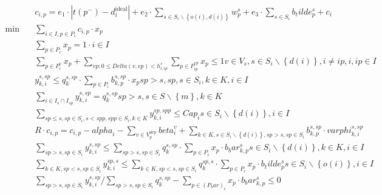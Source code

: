 \begin{align}
  & c_{i , p} = e_{1} \cdot \left|t \left(p^{-}\right) - d_{i}^{\text{ideal}}\right| + e_{2} \cdot \sum_{s \in S_{i} \backslash \left\{o \left(i\right) , d \left(i\right)\right\}} w_{p}^{s} + e_{3} \cdot \sum_{s \in S_{i}} b_tilde_{p}^{s} + c_{i} \tag{eq\_0001} \\
  \min\quad & \sum_{i \in I, p \in P_{i}} c_{i , p} \cdot x_{p} \tag{eq\_0002} \\
  & \sum_{p \in P_{i}} x_{p} = 1 \cdot i \in I \tag{eq\_0003} \\
  & \sum_{p \in P_{i}^{v}} x_{p} + \underset{vp : 0 \leq \mathit{Delta} \left(v , vp\right) < h_{i , ip}^{s}}{\sum} \underset{p \in P_{ip}^{vp}}{\sum} x_{p} \leq 1 v \in V_{s} , s \in S_{i} \backslash \left\{d \left(i\right)\right\} , i \neq ip , i , ip \in I \tag{eq\_0004} \\
  & y_{k , i}^{s , sp} \leq q_{k}^{s , sp} \cdot \sum_{p \in P_{i}} b_{k , p}^{s , sp} \cdot x_{p} sp > s , sp , s \in S_{i} , k \in K , i \in I \tag{eq\_0005} \\
  & \underset{i \in I_{s} \cap I_{sp}}{\sum} y_{k , i}^{s , sp} = q_{k}^{s , sp} sp > s , s \in S \backslash \left\{m\right\} , k \in K \tag{eq\_0006} \\
  & \sum_{sp \leq s , sp \in S_{i}, s < spp , spp \in S_{i}, k \in K} y_{k , i}^{sp , spp} \leq \mathit{Cap}_{i} s \in S_{i} \backslash \left\{d \left(i\right)\right\} , i \in I \tag{eq\_0007} \\
  & R \cdot c_{i , p} = c_{i , p} - \mathit{alpha}_{i} - \underset{v \in V_{p}^{\text{dep}}}{\sum} \mathit{beta}_{i}^{v} + \sum_{k \in K, s \in S_{i} \backslash \left\{d \left(i\right)\right\}, sp > s , sp \in S_{i}} b_{k , p}^{s , sp} \cdot \mathit{varphi}_{k , i}^{s , sp} \tag{eq\_0008} \\
  & \sum_{sp > s , sp \in S_{i}} y_{k , i}^{s , sp} \leq \sum_{sp > s , sp \in S_{i}} q_{k}^{s , sp} \cdot \sum_{p \in P_{i}} x_{p} \cdot b_bar_{k , p}^{s} s \in S_{i} \backslash \left\{d \left(i\right)\right\} , k \in K , i \in I \tag{eq\_0009} \\
  & \sum_{k \in K, sp < s , sp \in S_{i}} y_{k , i}^{sp , s} \leq \sum_{k \in K, sp < s , sp \in S_{i}} q_{k}^{sp , s} \cdot \sum_{p \in P_{i}} x_{p} \cdot b_tilde_{p}^{s} s \in S_{i} \backslash \left\{o \left(i\right)\right\} , i \in I \tag{eq\_0010} \\
  & \sum_{sp > s , sp \in S_{i}} y_{k , i}^{s , sp} / \sum_{sp > s , sp \in S_{i}} q_{k}^{s , sp} - \sum_{p \in \left(P_bar\right)_{i}} x_{p} \cdot b_bar_{k , p}^{s} \leq 0 \tag{eq\_0011} \\

\end{align}
